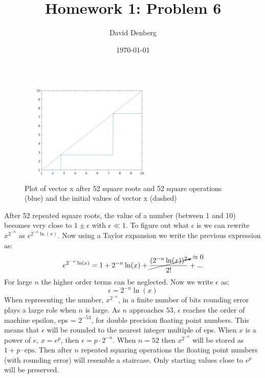 \documentclass[12pt]{article}
\title{Homework 1: Problem 6}
\author{David Denberg}
\date{\today}
\begin{document}
\maketitle
\begin{figure}[!h]
\centering
\includegraphics[width=0.6\textwidth]{plot.png}
\caption{Plot of vector x after 52 square roots and 52 square operations (blue) and the initial values of vector x (dashed)}
\end{figure}

After 52 repeated square roots, the value of a number (between 1 and 10) becomes very close to $1 \pm \epsilon$ with $\epsilon \ll 1$. To figure out what $\epsilon$ is we can rewrite $x^{2^{-n}}$ as $e^{2^{-n}\ln(x)}$. Now using a Taylor expansion we write the previous expression as:
\[
e^{2^{-n}\ln(x)} = 1 + 2^{-n} \ln(x) + \cancelto{\approx 0}{\frac{(2^{-n} \ln(x))^2}{2!}} + ...
\]
For large $n$ the higher order terms can be neglected. Now we write $\epsilon$ as:
\[
\epsilon = 2^{-n} \ln(x)
\]
When representing the number, $x^{2^{-n}}$, in a finite number of bits rounding error plays a large role when $n$ is large. As $n$ approaches $53$, $\epsilon$ reaches the order of machine epsilon, eps = $2^{-53}$, for double precision floating point numbers. This means that $\epsilon$ will be rounded to the nearest integer multiple of eps. When $x$ is a power of $e$, $x = e^{p}$, then $\epsilon = p \cdot 2^{-n}$. When $n = 52$ then $x^{2^{-n}}$ will be stored as $1 + p \cdot \mathrm{eps}$. Then after $n$ repeated squaring operations the floating point numbers (with rounding error) will resemble a staircase. Only starting values close to $e^p$ will be preserved.
\end{document}
